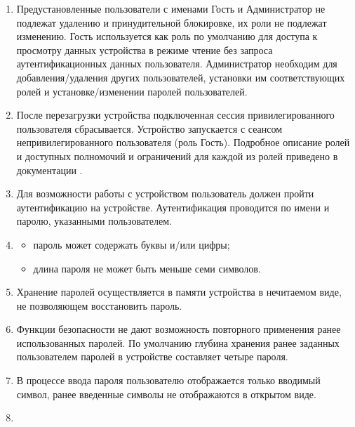 \begin{enumerate}[label=\arabic{section}.\arabic{subsection}.\arabic*, labelsep=4pt, leftmargin=0pt, itemindent=57pt]
\begin{enumerate}[label=\arabic{section}.\arabic{subsection}.\arabic{enumi}.\arabic*, labelsep=4pt, leftmargin=0em, itemindent=65pt, parsep=0pt]
\item
Предустановленные пользователи с именами Гость и Администратор не подлежат удалению и принудительной блокировке, их роли не подлежат изменению.
Гость используется как роль по умолчанию для доступа к просмотру данных устройства в режиме чтение без запроса аутентификационных данных пользователя.
Администратор необходим для добавления/удаления других пользователей, установки им соответствующих ролей и установке/изменении паролей пользователей.

\item
После перезагрузки устройства подключенная сессия привилегированного пользователя сбрасывается.
Устройство запускается с сеансом непривилегированного пользователя (роль Гость).
Подробное описание ролей и доступных полномочий и ограничений для каждой из ролей приведено в документации \ManualUnitGeneral.

\item
Для возможности работы с устройством пользователь должен пройти аутентификацию на устройстве.
Аутентификация проводится по имени и паролю, указанными пользователем. 

\item
{}
\begin{itemize}
    \item пароль может содержать буквы и/или цифры;
    \item длина пароля не может быть меньше семи символов. 
\end{itemize}

\item
Хранение паролей осуществляется в памяти устройства в нечитаемом виде, не позволяющем восстановить пароль.

\item
Функции безопасности не дают возможность повторного применения ранее использованных паролей.
По умолчанию глубина хранения ранее заданных пользователем паролей в устройстве составляет четыре пароля.

\item
В процессе ввода пароля пользователю отображается только вводимый символ, ранее введенные символы не отображаются в открытом виде.

\item
{}


\end{enumerate}
\end{enumerate}
